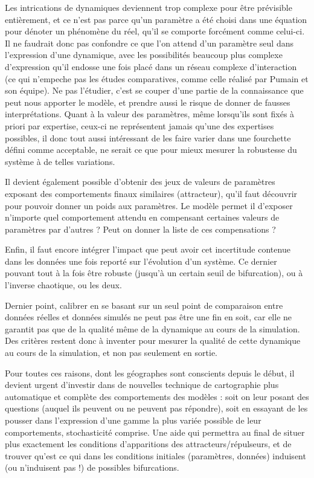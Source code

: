 Les intrications de dynamiques deviennent trop complexe pour être prévisible entièrement, et ce n'est pas parce qu'un paramètre a été choisi dans une équation pour dénoter un phénomène du réel, qu'il se comporte forcément comme celui-ci. Il ne faudrait donc pas confondre ce que l'on attend d'un paramètre seul dans l'expression d'une dynamique, avec les possibilités beaucoup plus complexe d'expression qu'il endosse une fois placé dans un réseau complexe d'interaction (ce qui n'empeche pas les études comparatives, comme celle réalisé par Pumain et son équipe). Ne pas l'étudier, c'est se couper d'une partie de la connaissance que peut nous apporter le modèle, et prendre aussi le risque de donner de fausses interprétations. Quant à la valeur des paramètres, même lorsqu'ils sont fixés à priori par expertise, ceux-ci ne représentent jamais qu'une des expertises possibles, il donc tout aussi intéressant de les faire varier dans une fourchette défini comme acceptable, ne serait ce que pour mieux mesurer la robustesse du système à de telles variations.

Il devient également possible d'obtenir des jeux de valeurs de paramètres exposant des comportements finaux similaires (attracteur), qu'il faut découvrir pour pouvoir donner un poids aux paramètres. Le modèle permet il d'exposer n'importe quel comportement attendu en compensant certaines valeurs de paramètres par d'autres ? Peut on donner la liste de ces compensations ?

Enfin, il faut encore intégrer l'impact que peut avoir cet incertitude contenue dans les données une fois reporté sur l'évolution d'un système. Ce dernier pouvant tout à la fois être robuste (jusqu'à un certain seuil de bifurcation), ou à l'inverse chaotique, ou les deux.

Dernier point, calibrer en se basant sur un seul point de comparaison entre données réelles et données simulés ne peut pas être une fin en soit, car elle ne garantit pas que de la qualité même de la dynamique au cours de la simulation. Des critères restent donc à inventer pour mesurer la qualité de cette dynamique au cours de la simulation, et non pas seulement en sortie.

Pour toutes ces raisons, dont les géographes sont conscients depuis le début, il devient urgent d'investir dans de nouvelles technique de cartographie plus automatique et complète des comportements des modèles : soit on leur posant des questions (auquel ils peuvent ou ne peuvent pas répondre), soit en essayant de les pousser dans l'expression d'une gamme la plus variée possible de leur comportements, stochasticité comprise. Une aide qui permettra au final de situer plus exactement les conditions d'apparitions des attracteurs/répulseurs, et de trouver qu'est ce qui dans les conditions initiales (paramètres, données) induisent (ou n'induisent pas !) de possibles bifurcations.



